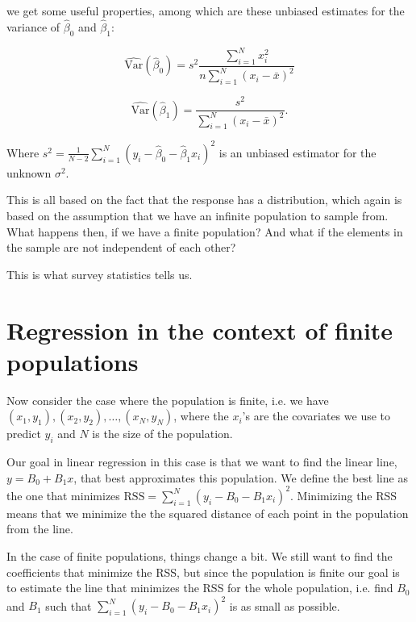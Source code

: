 \documentclass{article}
\begin{document}
we get some useful properties, among which are these unbiased estimates for the
variance of \(\hat{\beta}_0\) and \(\hat{\beta}_1\):

\begin{equation*}
  \widehat{\mathrm{Var}} \left( \hat{\beta}_0 \right) = s^2 \frac{\sum_{i = 1}^N x_i^2}{n
    \sum_{i = 1}^N \left( x_i - \bar{x} \right)^2}
\end{equation*}
  

\begin{equation*}
  \widehat{\mathrm{Var}} \left( \hat{\beta}_1 \right) = \frac{s^2}{
    \sum_{i = 1}^N \left( x_i - \bar{x} \right)^2}.
\end{equation*}

Where \(s^2 = \frac{1}{N - 2} \sum_{i = 1}^N\left( y_i - \hat{\beta}_0 -
  \hat{\beta}_1 x_i \right)^2\) is an
unbiased estimator for the unknown \(\sigma^2\).

This is all based on the fact that the response has a distribution, which again
is based on the assumption that we have an infinite population to sample from.
What happens then, if we have a finite population? And what if the elements in
the sample are not independent of each other?

This is what survey statistics tells us.



\section{Regression in the context of finite populations}
Now consider the case where the population is finite, i.e. we have \((x_1, y_1),
(x_2, y_2), \dots , (x_N, y_N)\), where the \(x_i\)'s are the covariates we use to
predict \(y_i\) and \(N\) is the size of the population.

Our goal in linear regression in this case is that we want to find the linear
line, \(y = B_0 + B_1x\), that best approximates this population. We define the best line as the one
that minimizes \(\mathrm{RSS} = \sum_{i = 1}^N (y_i - B_0 - B_1 x_i)^2\).
Minimizing the RSS means that we minimize the the squared distance of each point
in the population from the line.

In the case of finite populations, things change a bit. We still want to find the
coefficients that minimize the RSS, but since the population is finite our goal
is to estimate the line that minimizes the RSS for the whole population, i.e. find
\(B_0\) and \(B_1\) such that \(\sum_{i = 1}^N (y_i - B_0 - B_1 x_i)^2\) is as small as
possible.
\end{document}

